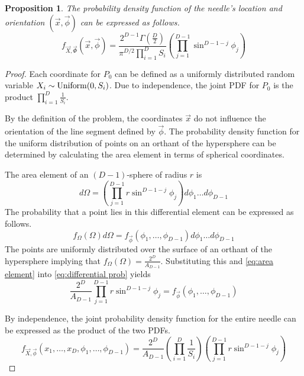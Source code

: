 \documentclass{article}
\newtheorem{proposition}{Proposition}
\begin{document}
\begin{proposition} \label{p:pdf}
The probability density function of the needle's location and orientation $(\vec{x}, \vec{\phi})$ can be 
expressed as follows.
\begin{equation}
	f_{\vec{X}, \vec{\Phi}}(\vec{x}, \vec{\phi}) = \frac{2^{D-1}\Gamma(\frac{D}{2})}{\pi^{D/2}\prod_{i=1}^{D}S_i}\left( \prod_{j=1}^{D-1}\sin^{D-1-j}\phi_j \right)
\end{equation}
\end{proposition}
\begin{proof}
	Each coordinate for $P_0$ can be defined as a uniformly distributed random 
	variable $X_i\sim{\rm Uniform}(0,S_i)$. Due to independence, the joint PDF 
	for $P_0$ is the product $\prod_{i=1}^D \frac{1}{S_i}$. 
	
	By the definition of the problem, the coordinates $\vec{x}$ do not influence 
	the orientation of the line segment defined by $\vec{\phi}$. The probability 
	density function for the uniform distribution of points on an orthant of the 
	hypersphere can be determined by calculating the area element in terms of 
	spherical coordinates.

	The area element of an $(D-1)$-sphere of radius $r$ is
	\begin{equation} \label{eq:area element}
		d\Omega = \left(\prod_{j=1}^{D-1}r\sin^{D-1-j}\phi_j\right)d\phi_1 \hdots d\phi_{D-1}
	\end{equation}
	The probability that a point lies in this differential element can be expressed as follows.
	\begin{equation} \label{eq:differential prob}
		f_{\Omega}(\Omega)d\Omega = f_{\vec{\phi}}(\phi_1, \hdots, \phi_{D-1})d\phi_1 \hdots d\phi_{D-1}
	\end{equation}
	The points are uniformly distributed over the surface of an orthant of the hypersphere
	implying that $f_{\Omega}(\Omega) = \frac{2^D}{A_{D-1}}$. Substituting this and
	\ref{eq:area element} into \ref{eq:differential prob} yields
	\begin{equation}
		\frac{2^D}{A_{D-1}}\prod_{j=1}^{D-1}r\sin^{D-1-j}\phi_j = f_{\vec{\phi}}(\phi_1, \hdots, \phi_{D-1})
	\end{equation}

	By independence, the joint probability density function for the entire needle
	can be expressed as the product of the two PDFs.
	\begin{equation} 
		f_{\vec{X},\vec{\phi}}(x_1, \hdots, x_D, \phi_1, \hdots, \phi_{D-1}) = \frac{2^D}{A_{D-1}}\left(\prod_{i=1}^D\frac{1}{S_i}\right)\left(\prod_{j=1}^{D-1}r\sin^{D-1-j}\phi_j\right)
	\end{equation}


\end{proof}
\end{document}

